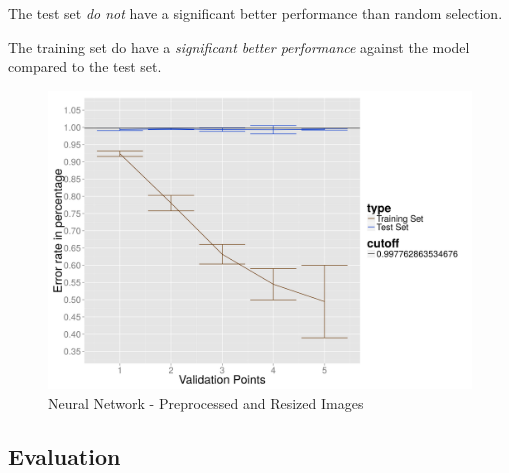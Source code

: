 The test set \emph{do not} have a significant better performance than random selection.

The training set do have a \emph{significant better performance} against the model compared to the test set.

\begin{figure}
  \centering
  \includegraphics[width=0.9\linewidth]{Images/DNNpreprocessed}
  \caption{Neural Network - Preprocessed and Resized Images}
  \label{fig:nn-preprocessed}
\end{figure}

\subsection{Evaluation}


\label{subsec:evaluation}